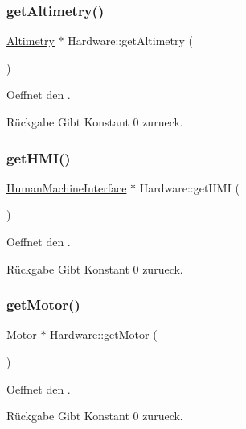 \subsubsection{\texorpdfstring{get\+Altimetry()}{getAltimetry()}}
{\footnotesize\ttfamily \hyperlink{class_altimetry}{Altimetry} $\ast$ Hardware\+::get\+Altimetry (\begin{DoxyParamCaption}{ }\end{DoxyParamCaption})}

Oeffnet den .

\begin{DoxyReturn}{Rückgabe}
Gibt Konstant 0 zurueck. 
\end{DoxyReturn}
\hypertarget{class_hardware_aec8f013270ef5d6e79afed214b5c18cf}{}\label{class_hardware_aec8f013270ef5d6e79afed214b5c18cf} 
\subsubsection{\texorpdfstring{get\+H\+M\+I()}{getHMI()}}
{\footnotesize\ttfamily \hyperlink{class_human_machine_interface}{Human\+Machine\+Interface} $\ast$ Hardware\+::get\+H\+MI (\begin{DoxyParamCaption}{ }\end{DoxyParamCaption})}

Oeffnet den .

\begin{DoxyReturn}{Rückgabe}
Gibt Konstant 0 zurueck. 
\end{DoxyReturn}
\hypertarget{class_hardware_a0a896143b14292ea1805d43e384b4fa1}{}\label{class_hardware_a0a896143b14292ea1805d43e384b4fa1} 
\subsubsection{\texorpdfstring{get\+Motor()}{getMotor()}}
{\footnotesize\ttfamily \hyperlink{class_motor}{Motor} $\ast$ Hardware\+::get\+Motor (\begin{DoxyParamCaption}{ }\end{DoxyParamCaption})}

Oeffnet den .

\begin{DoxyReturn}{Rückgabe}
Gibt Konstant 0 zurueck. 
\end{DoxyReturn}
\hypertarget{class_hardware_a6acc1b03b3c39ddbd681058f49e9f1bd}{}\label{class_hardware_a6acc1b03b3c39ddbd681058f49e9f1bd} 
